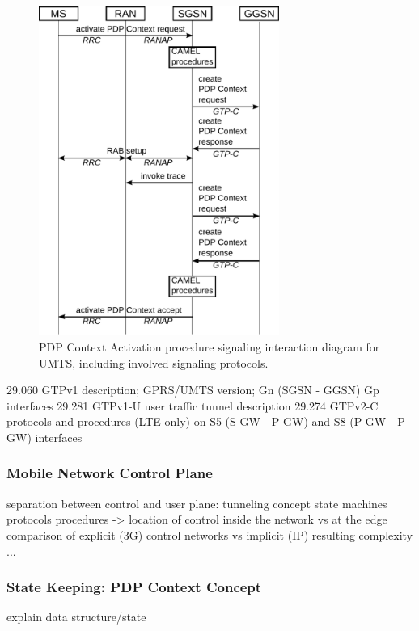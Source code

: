 	\begin{figure}[htb]
		\centering
		\includegraphics[width=0.7\textwidth]{images/pdp-context-activation-procedure.pdf}
		\caption{PDP Context Activation procedure signaling interaction diagram for \gls{UMTS}, including involved signaling protocols.}
		\label{c4:fig:pdpcontextactivationinteraction}
	\end{figure}

	29.060 \cite{3gpp.29.060} GTPv1 description; GPRS/UMTS version; Gn (SGSN - GGSN) Gp interfaces
	29.281 \cite{3gpp.29.281} GTPv1-U user traffic tunnel description
	29.274 \cite{3gpp.29.274} GTPv2-C protocols and procedures (LTE only) on S5 (S-GW - P-GW) and S8 (P-GW - P-GW) interfaces

\subsubsection{Mobile Network Control Plane}

separation between control and user plane: tunneling concept
state machines
protocols
procedures -> location of control inside the network vs at the edge
comparison of explicit (3G) control networks vs implicit (IP)
resulting complexity
...



\subsubsection{State Keeping: \texorpdfstring{\acrshort{PDP}}{PDP} Context Concept}
explain data structure/state



